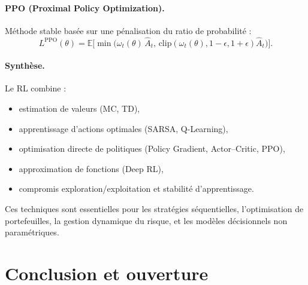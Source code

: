 \documentclass[11pt,a4paper]{article}
\newcommand{\1}{\mathbf{1}}
\begin{document}
\paragraph{PPO (Proximal Policy Optimization).}
Méthode stable basée sur une pénalisation du ratio de probabilité :
\[
L^{\mathrm{PPO}}(\theta)
=
\mathbb{E}\Big[
\min\big(
\omega_t(\theta)\,\hat A_t,\,
\mathrm{clip}(\omega_t(\theta),1-\epsilon,1+\epsilon)\hat A_t
\big)
\Big].
\]

\paragraph{Synthèse.}

Le RL combine :
\begin{itemize}
  \item estimation de valeurs (MC, TD),
  \item apprentissage d'actions optimales (SARSA, Q-Learning),
  \item optimisation directe de politiques (Policy Gradient, Actor--Critic, PPO),
  \item approximation de fonctions (Deep RL),
  \item compromis exploration/exploitation et stabilit\'e d'apprentissage.
\end{itemize}

Ces techniques sont essentielles pour les stratégies séquentielles,
l'optimisation de portefeuilles, la gestion dynamique du risque,
et les modèles décisionnels non paramétriques.

\section{Conclusion et ouverture}
\end{document}
